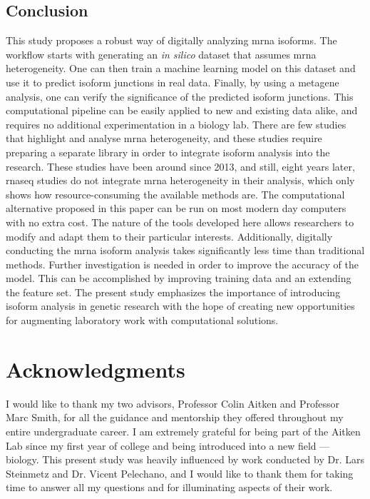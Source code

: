 \documentclass[12pt]{article}
\begin{document}
\subsection{Conclusion}

This study proposes a robust way of digitally analyzing \acrshort{mrna} isoforms. The workflow starts with generating an \textit{in silico} dataset that assumes \acrshort{mrna} heterogeneity. One can then train a machine learning model on this dataset and use it to predict isoform junctions in real data. Finally, by using a metagene analysis, one can verify the significance of the predicted isoform junctions. This computational pipeline can be easily applied to new and existing data alike, and requires no additional experimentation in a biology lab. There are few studies that highlight and analyse \acrshort{mrna} heterogeneity, and these studies require preparing a separate library in order to integrate isoform analysis into the research. These studies have been around since 2013, and still, eight years later, \acrshort{rnaseq} studies do not integrate \acrshort{mrna} heterogeneity in their analysis, which only shows how resource-consuming the available methods are. The computational alternative proposed in this paper can be run on most modern day computers with no extra cost. The nature of the tools developed here allows researchers to modify and adapt them to their particular interests. Additionally, digitally conducting the \acrshort{mrna} isoform analysis takes significantly less time than traditional methods. Further investigation is needed in order to improve the accuracy of the model. This can be accomplished by improving training data and an extending the feature set. The present study emphasizes the importance of introducing isoform analysis in genetic research with the hope of creating new opportunities for augmenting laboratory work with computational solutions. 



\section*{Acknowledgments}

I would like to thank my two advisors, Professor Colin Aitken and  Professor Marc Smith, for all the guidance and mentorship they offered throughout my entire undergraduate career. I am extremely grateful for being part of the Aitken Lab since my first year of college and being introduced into a new field --- biology. This present study was heavily influenced by work conducted by Dr. Lars Steinmetz and Dr. Vicent Pelechano, and I would like to thank them for taking time to answer all my questions and for illuminating aspects of their work.  
\end{document}
